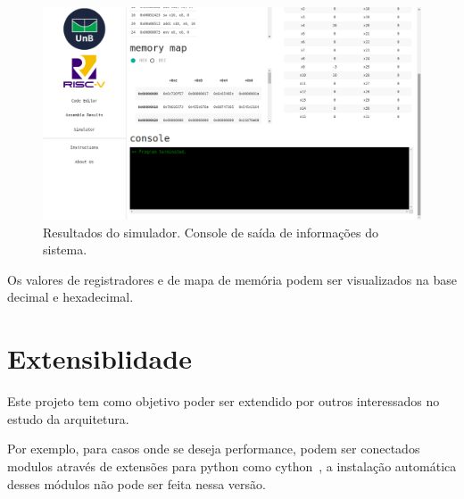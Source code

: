 	\begin{figure}[h!]
	  \includegraphics[width=\linewidth]{img/simulator_results_2.png}
	  \caption{Resultados do simulador. Console de saída de informações do sistema.}
	  \label{fig:simulator_results_2}
	\end{figure}

	Os valores de registradores e de mapa de memória podem ser visualizados na base decimal e hexadecimal.


\section{Extensiblidade}

	Este projeto tem como objetivo poder ser extendido por outros interessados no estudo da arquitetura. 

	Por exemplo, para casos onde se deseja performance, podem ser conectados modulos através de extensões para python como cython~\cite{cython_home}, a instalação automática desses módulos não pode ser feita nessa versão.
